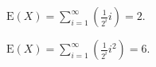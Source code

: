 $\text{E}(X) = \sum_{i=1}^{\infty}(\frac{1}{2^{i}}i) = 2$.

$\text{E}(X) = \sum_{i=1}^{\infty}(\frac{1}{2^{i}}i^{2}) = 6$.